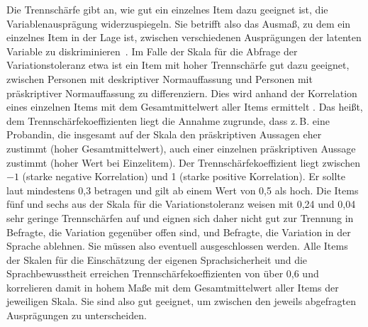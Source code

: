 Die Trennschärfe gibt an, wie gut ein einzelnes Item dazu geeignet ist, die Variablen\-aus\-prä\-gung widerzuspiegeln. 
Sie betrifft also \glqq das Ausmaß, zu dem ein einzelnes Item in der Lage ist, zwischen verschiedenen Ausprägungen der latenten Variable zu diskriminieren\grqq{}~\citep[275]{Gerich2010}. 
Im Falle der Skala für die Abfrage der Variationstoleranz etwa ist ein Item mit hoher Trennschärfe gut dazu geeignet, zwischen Personen mit deskriptiver Normauffassung und Personen mit präskriptiver Normauffassung zu differenziern. 
Dies wird anhand der Korrelation eines einzelnen Items mit dem Gesamtmittelwert aller Items ermittelt \citep[s.][289]{Doring2016}. 
Das heißt, dem Trennschärfekoeffizienten liegt die Annahme zugrunde, dass z.\,B. eine Probandin, die insgesamt auf der Skala den präskriptiven Aussagen eher zustimmt (hoher Gesamtmittelwert), auch einer einzelnen präskriptiven Aussage zustimmt (hoher Wert bei Einzelitem). 
Der Trennschärfekoeffizient liegt zwischen $-1$ (starke negative Korrelation) und 1 (starke positive Korrelation). 
Er sollte laut \citet[478]{Doring2016} mindestens 0,3 betragen und gilt ab einem Wert von 0,5 als hoch. 
Die Items fünf und sechs aus der Skala für die Variationstoleranz weisen mit 0,24 und 0,04 sehr geringe Trennschärfen auf und eignen sich daher nicht gut zur Trennung in Befragte, die Variation gegenüber offen sind, und Befragte, die Variation in der Sprache ablehnen. 
Sie müssen also eventuell ausgeschlossen werden. 
Alle Items der Skalen für die Einschätzung der eigenen Sprachsicherheit und die Sprachbewusstheit erreichen Trennschärfekoeffizienten von über 0,6 und korrelieren damit in hohem Maße mit dem Gesamtmittelwert aller Items der jeweiligen Skala. 
Sie sind also gut geeignet, um zwischen den jeweils abgefragten Ausprägungen zu unterscheiden. 

